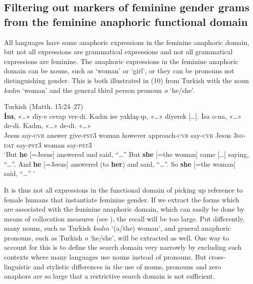 \documentclass[output=collectionpaper]{langsci/langscibook}
\begin{document}
\subsection{Filtering out markers of feminine gender grams from the feminine anaphoric functional domain}
\label{sec:BW:2.4}

All languages have some anaphoric expressions in the feminine anaphoric domain, but not all expressions are grammatical expressions and not all grammatical expressions are feminine. The anaphoric expressions in the feminine anaphoric domain can be nouns, such as ‘woman’ or ‘girl’, or they can be pronouns not distinguishing gender. This is both illustrated in (10) from Turkish with the noun \textit{kadın} ‘woman’ and the general third person pronoun \textit{o} ‘he/she’.

\eas\label{ex:BW:10}
Turkish (Matth. 15:24–27)\\
\gll \textbf{İsa}, «\ldots»	diy-e	cevap	ver-di.	Kadın	ise	yaklaş-ıp, «\ldots»	diyerek [\ldots]. İsa	o-na, «\ldots»	de-di.	Kadın, «\ldots»	de-di. «\ldots»\\
Jesus	{} say-\textsc{cvb}	answer	give-\textsc{pst3}	woman	however	approach-\textsc{cvb} {} say-\textsc{cvb} {} Jesus	\textsc{3sg-dat} {}	say-\textsc{pst3}	woman {}	say-\textsc{pst3} {}\\
\glt ‘But \textbf{he} [=Jesus] answered and said, “\ldots” But \textbf{she} [=the woman] came [\ldots] saying, “\ldots”. And \textbf{he} [=Jesus] answered (to \textbf{her}) and said, “\ldots”. So \textbf{she} [=the woman] said, “\ldots” ’
\zs

It is thus not all expressions in the functional domain of picking up reference to female humans that instantiate feminine gender. If we extract the forms which are associated with the feminine anaphoric domain, which can easily be done by means of collocation measures (see ), the recall will be too large. Put differently, many nouns, such as Turkish \textit{kadın} ‘(a/the) woman’, and general anaphoric pronouns, such as Turkish \textit{o} ‘he/she’, will be extracted as well. One way to account for this is to define the search domain very narrowly by excluding such contexts where many languages use nouns instead of pronouns. But cross-linguistic and stylistic differences in the use of nouns, pronouns and zero anaphors are so large that a restrictive search domain is not sufficient.
\end{document}
